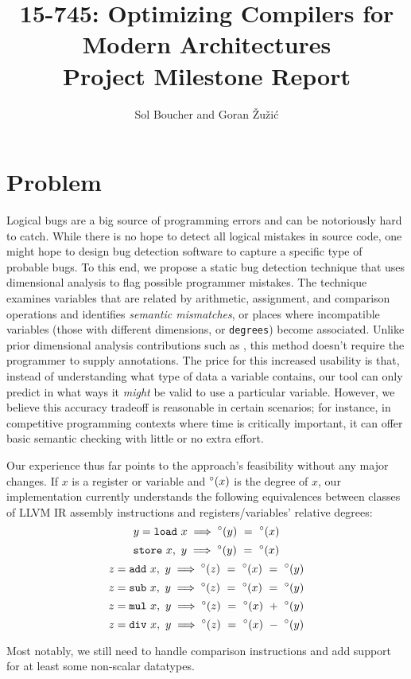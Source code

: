 \documentclass[12pt]{article}
\title{{\small 15-745: Optimizing Compilers for Modern Architectures} \\ Project Milestone Report}
\author{Sol Boucher and Goran \v{Z}u\v{z}i\'c}
\begin{document}
\maketitle

\section{Problem}

Logical bugs are a big source of programming errors and can be notoriously hard to catch.
While there is no hope to detect all logical mistakes in source code, one might hope to design bug detection software to capture a specific type of probable bugs.
To this end, we propose a static bug detection technique that uses dimensional analysis to flag possible programmer mistakes.
The technique examines variables that are related by arithmetic, assignment, and comparison operations and identifies \textit{semantic mismatches}, or places where incompatible variables (those with different dimensions, or \texttt{degrees}) become associated.
Unlike prior dimensional analysis contributions such as \cite{hilfinger1988ada}, this method doesn't require the programmer to supply annotations.
The price for this increased usability is that, instead of understanding what type of data a variable contains, our tool can only predict in what ways it \textit{might} be valid to use a particular variable.
However, we believe this accuracy tradeoff is reasonable in certain scenarios; for instance, in competitive programming contexts where time is critically important, it can offer basic semantic checking with little or no extra effort.

Our experience thus far points to the approach's feasibility without any major changes.
If $x$ is a register or variable and $\degree(x)$ is the degree of $x$, our implementation currently understands the following equivalences between classes of LLVM IR assembly instructions and registers/variables' relative degrees:
\[y = \mathtt{load}\ x \implies \degree(y)\ =\ \degree(x)\]
\[\mathtt{store}\ x,\ y \implies \degree(y)\ =\ \degree(x)\]
\[z = \mathtt{add}\ x,\ y \implies \degree(z)\ =\ \degree(x)\ =\ \degree(y)\]
\[z = \mathtt{sub}\ x,\ y \implies \degree(z)\ =\ \degree(x)\ =\ \degree(y)\]
\[z = \mathtt{mul}\ x,\ y \implies \degree(z)\ =\ \degree(x)\ +\ \degree(y)\]
\[z = \mathtt{div}\ x,\ y \implies \degree(z)\ =\ \degree(x)\ -\ \degree(y)\]

Most notably, we still need to handle comparison instructions and add support for at least some non-scalar datatypes.
\end{document}
